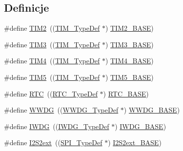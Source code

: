 \subsection*{Definicje}
\begin{DoxyCompactItemize}
\item 
\#define \hyperlink{group___peripheral__declaration_ga3cfac9f2e43673f790f8668d48b4b92b}{T\+I\+M2}~((\hyperlink{struct_t_i_m___type_def}{T\+I\+M\+\_\+\+Type\+Def} $\ast$) \hyperlink{group___peripheral__memory__map_ga00d0fe6ad532ab32f0f81cafca8d3aa5}{T\+I\+M2\+\_\+\+B\+A\+SE})
\item 
\#define \hyperlink{group___peripheral__declaration_ga61ee4c391385607d7af432b63905fcc9}{T\+I\+M3}~((\hyperlink{struct_t_i_m___type_def}{T\+I\+M\+\_\+\+Type\+Def} $\ast$) \hyperlink{group___peripheral__memory__map_gaf0c34a518f87e1e505cd2332e989564a}{T\+I\+M3\+\_\+\+B\+A\+SE})
\item 
\#define \hyperlink{group___peripheral__declaration_ga91a09bad8bdc7a1cb3d85cf49c94c8ec}{T\+I\+M4}~((\hyperlink{struct_t_i_m___type_def}{T\+I\+M\+\_\+\+Type\+Def} $\ast$) \hyperlink{group___peripheral__memory__map_ga56e2d44b0002f316527b8913866a370d}{T\+I\+M4\+\_\+\+B\+A\+SE})
\item 
\#define \hyperlink{group___peripheral__declaration_ga5125ff6a23a2ed66e2e19bd196128c14}{T\+I\+M5}~((\hyperlink{struct_t_i_m___type_def}{T\+I\+M\+\_\+\+Type\+Def} $\ast$) \hyperlink{group___peripheral__memory__map_ga3e1671477190d065ba7c944558336d7e}{T\+I\+M5\+\_\+\+B\+A\+SE})
\item 
\#define \hyperlink{group___peripheral__declaration_ga5359a088f5d8b20ce74d920e46059304}{R\+TC}~((\hyperlink{struct_r_t_c___type_def}{R\+T\+C\+\_\+\+Type\+Def} $\ast$) \hyperlink{group___peripheral__memory__map_ga4265e665d56225412e57a61d87417022}{R\+T\+C\+\_\+\+B\+A\+SE})
\item 
\#define \hyperlink{group___peripheral__declaration_ga9821fd01757986612ddb8982e2fe27f1}{W\+W\+DG}~((\hyperlink{struct_w_w_d_g___type_def}{W\+W\+D\+G\+\_\+\+Type\+Def} $\ast$) \hyperlink{group___peripheral__memory__map_ga9a5bf4728ab93dea5b569f5b972cbe62}{W\+W\+D\+G\+\_\+\+B\+A\+SE})
\item 
\#define \hyperlink{group___peripheral__declaration_gad16b79dd94ee85d261d08a8ee94187e7}{I\+W\+DG}~((\hyperlink{struct_i_w_d_g___type_def}{I\+W\+D\+G\+\_\+\+Type\+Def} $\ast$) \hyperlink{group___peripheral__memory__map_ga8543ee4997296af5536b007cd4748f55}{I\+W\+D\+G\+\_\+\+B\+A\+SE})
\item 
\#define \hyperlink{group___peripheral__declaration_ga9efe6de71871a01dd38abcb229f30c02}{I2\+S2ext}~((\hyperlink{struct_s_p_i___type_def}{S\+P\+I\+\_\+\+Type\+Def} $\ast$) \hyperlink{group___peripheral__memory__map_gaa5f7b241ed5b756decd835300c9e7bc9}{I2\+S2ext\+\_\+\+B\+A\+SE})

\end{DoxyCompactItemize}
